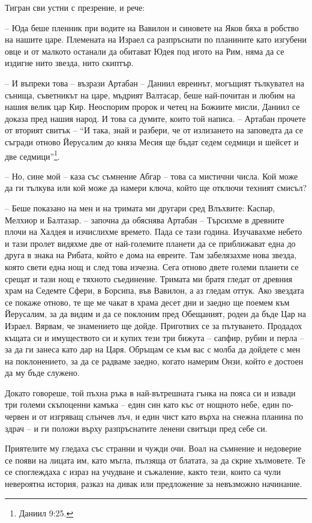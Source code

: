 Тигран сви устни с презрение, и рече:

-- Юда беше пленник при водите на Вавилон и синовете на Яков бяха в робство на
нашите царе. Племената на Израел са разпръснати по планините като изгубени овце
и от малкото останали да обитават Юдея под игото на Рим, няма да се издигне нито
звезда, нито скиптър.

-- И въпреки това -- възрази Артабан -- Даниил евреинът, могъщият тълкувател на
сънища, съветникът на царе, мъдрият Валтасар, беше най-почитан и любим на нашия
велик цар Кир. Неоспорим пророк и четец на Божиите мисли, Даниил се доказа пред
нашия народ. И това са думите, които той написа. -- Артабан прочете от вторият
свитък -- ``И така, знай и разбери, че от излизането на заповедта да се съгради
отново Йерусалим до княза Месия ще бъдат седем седмици и шейсет и две
седмици''\footnote{Даниил 9:25.}.

-- Но, сине мой -- каза със съмнение Абгар -- това са мистични числа. Кой може
да ги тълкува или кой може да намери ключа, който ще отключи техният смисъл?

-- Беше показано на мен и на тримата ми другари сред Влъхвите: Каспар, Мелхиор и
Балтазар. -- започна да обяснява Артабан -- Търсихме в древните плочи на Халдея
и изчислихме времето. Пада се тази година. Изучавахме небето и тази пролет
видяхме две от най-големите планети да се приближават една до друга в знака на
Рибата, който е дома на евреите. Там забелязахме нова звезда, която свети една
нощ и след това изчезна. Сега отново двете големи планети се срещат и тази нощ е
тяхното съединение. Тримата ми братя гледат от древния храм на Седемте Сфери, в
Борсипа, във Вавилон, а аз гледам оттук. Ако звездата се покаже отново, те ще ме
чакат в храма десет дни и заедно ще поемем към Йерусалим, за да видим и да се
поклоним пред Обещаният, роден да бъде Цар на Израел. Вярвам, че знамението ще
дойде. Приготвих се за пътуването. Продадох къщата си и имуществото си и купих
тези три бижута -- сапфир, рубин и перла -- за да ги занеса като дар на Царя.
Обръщам се към вас с молба да дойдете с мен на поклонението, за да се радваме
заедно, когато намерим Онзи, който е достоен да му бъде служено.

Докато говореше, той пъхна ръка в най-вътрешната гънка на пояса си и извади три
големи скъпоценни камъка -- един син като къс от нощното небе, един по-червен и
от изгряващ слънчев лъч, и един чист като върха на снежна планина по здрач -- и
ги положи върху разпръснатите ленени свитъци пред себе си.

Приятелите му гледаха със странни и чужди очи. Воал на съмнение и недоверие се
появи на лицата им, като мъгла, пълзяща от блатата, за да скрие хълмовете. Те се
споглеждаха с израз на учудване и съжаление, както тези, които са чули
невероятна история, разказ на дивак или предложение за невъзможно начинание.

